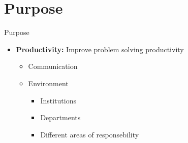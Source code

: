 \section{Purpose}
\begin{frame}{Purpose}

\begin{itemize}
	\item \textbf{Productivity:} Improve problem solving productivity
	\begin{itemize}
		\item Communication
		\item Environment
		\begin{itemize}
			\item Institutions
			\item Departments
			\item Different areas of responsebility
			\end{itemize}
	\end{itemize}
\end{itemize}


\end{frame}
